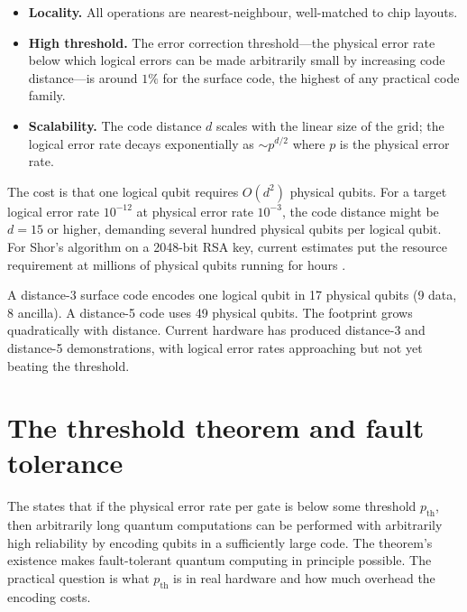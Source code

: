 \begin{itemize}
\item \textbf{Locality.} All operations are nearest-neighbour, well-matched to chip layouts.
\item \textbf{High threshold.} The error correction threshold---the physical error rate below which logical errors can be made arbitrarily small by increasing code distance---is around $1\%$ for the surface code, the highest of any practical code family.
\item \textbf{Scalability.} The code distance $d$ scales with the linear size of the grid; the logical error rate decays exponentially as $\sim p^{d/2}$ where $p$ is the physical error rate.
\end{itemize}

The cost is that one logical qubit requires $O(d^2)$ physical qubits. For a target logical error rate $10^{-12}$ at physical error rate $10^{-3}$, the code distance might be $d = 15$ or higher, demanding several hundred physical qubits per logical qubit. For Shor's algorithm on a 2048-bit RSA key, current estimates put the resource requirement at millions of physical qubits running for hours \citep{nielsen_quantum_2010}.

\begin{example}
A distance-3 surface code encodes one logical qubit in 17 physical qubits (9 data, 8 ancilla). A distance-5 code uses 49 physical qubits. The footprint grows quadratically with distance. Current hardware has produced distance-3 and distance-5 demonstrations, with logical error rates approaching but not yet beating the threshold.
\end{example}

\section{The threshold theorem and fault tolerance}

The  \citep{aharonov_fault-tolerant_2008,shor_fault-tolerant_1996} states that if the physical error rate per gate is below some threshold $p_{\text{th}}$, then arbitrarily long quantum computations can be performed with arbitrarily high reliability by encoding qubits in a sufficiently large code. The theorem's existence makes fault-tolerant quantum computing in principle possible. The practical question is what $p_{\text{th}}$ is in real hardware and how much overhead the encoding costs.

